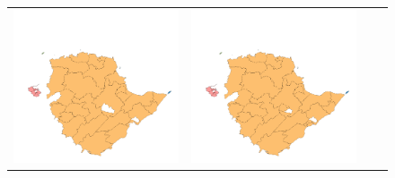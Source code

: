 \begin{figure}[p]
\begin{tabularx}{1\textwidth}{XXXX}
\includegraphics[width=1\linewidth]{images/ch6/contig/19}&
\includegraphics[width=1\linewidth]{images/ch6/contig/20} \\

\end{tabularx}
\end{figure}
